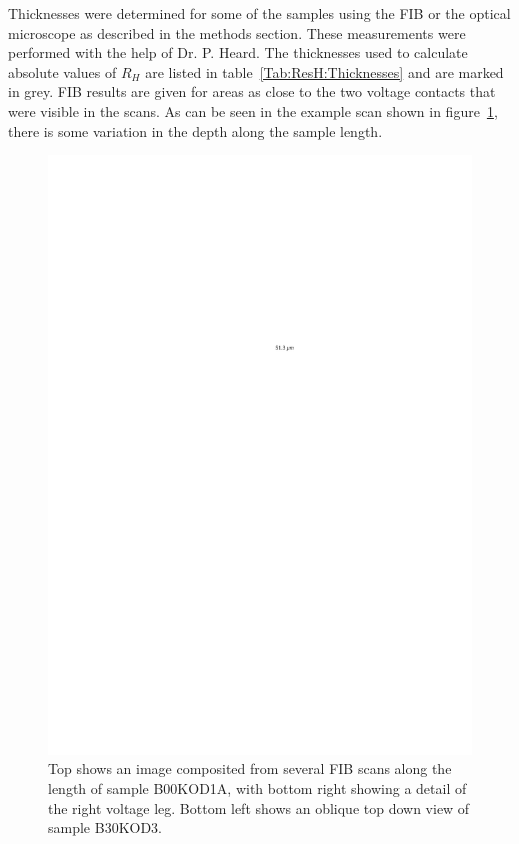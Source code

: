 Thicknesses were determined for some of the samples using the \ac{FIB} or the optical microscope as described in the methods section. These measurements were performed with the help of Dr. P. Heard. The thicknesses used to calculate absolute values of $R_H$ are listed in table~\ref{Tab:ResH:Thicknesses} and are marked in grey. \ac{FIB} results are given for areas as close to the two voltage contacts that were visible in the scans. As can be seen in the example scan shown in figure~\ref{Fig:ResH:FIBExamples}, there is some variation in the depth along the sample length.
\begin{figure}[htbp]
	\begin{center}
		\includegraphics[scale=0.9]{Chapter-HallBSCO/Figures/FIBExamples/FIBExamples}
		\caption{Top shows an image composited from several \ac{FIB} scans along the length of sample B00KOD1A, with bottom right showing a detail of the right voltage leg. Bottom left shows an oblique top down view of sample B30KOD3.}
		\label{Fig:ResH:FIBExamples}
	\end{center}
\end{figure}

